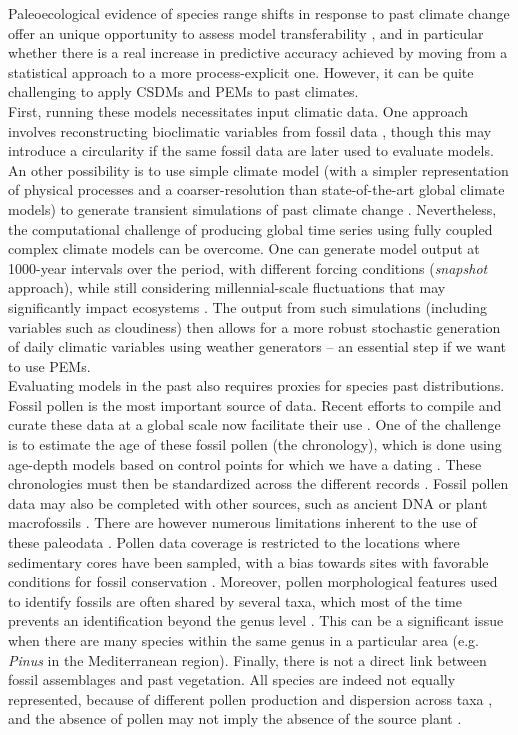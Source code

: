 Paleoecological evidence of species range shifts in response to past climate change offer an unique opportunity to assess model transferability \citep{Maguire2015}, and in particular whether there is a real increase in predictive accuracy achieved by moving from a statistical approach to a more process-explicit one. However, it can be quite challenging to apply CSDMs and PEMs to past climates. \\
First, running these models necessitates input climatic data. One approach involves reconstructing bioclimatic variables from fossil data \citep{CruzSilva2023}, though this may introduce a circularity if the same fossil data are later used to evaluate models. An other possibility is to use simple climate model (with a simpler representation of physical processes and a coarser-resolution than state-of-the-art global climate models) to generate transient simulations of past climate change \citep{Goosse2010}. Nevertheless, the computational challenge of producing global time series using fully coupled complex climate models can be overcome. One can generate model output at 1000-year intervals over the period, with different forcing conditions (\emph{snapshot} approach), while still considering millennial-scale fluctuations that may significantly impact ecosystems \citep{Armstrong2019}. The output from such simulations (including variables such as cloudiness) then allows for a more robust stochastic generation of daily climatic variables using weather generators \citep{Sommer2017} -- an essential step if we want to use PEMs. \\
Evaluating models in the past also requires proxies for species past distributions. 
Fossil pollen is the most important source of data. Recent efforts to compile and curate these data at a global scale now facilitate their use \citep{Fyfe2009, Williams2018}. One of the challenge is to estimate the age of these fossil pollen (the chronology), which is done using age-depth models based on control points for which we have a dating \citep{MorenoAmat2017}. These chronologies must then be standardized across the different records \citep{Herzschuh2022}. Fossil pollen data may also be completed with other sources, such as ancient DNA \citep{Dalen2007} or plant macrofossils \citep{Cordova2009}. There are however numerous limitations inherent to the use of these paleodata \citep{MorenoAmat2017}. Pollen data coverage is restricted to the locations where sedimentary cores have been sampled, with a bias towards sites with favorable conditions for fossil conservation \citep{Varela2011}. Moreover, pollen morphological features used to identify fossils are often shared by several taxa, which most of the time prevents an identification beyond the genus level \citep{MorenoAmat2017}. This can be a significant issue when there are many species within the same genus in a particular area (e.g. \emph{Pinus} in the Mediterranean region). Finally, there is not a direct link between fossil assemblages and past vegetation. All species are indeed not equally represented, because of different pollen production and  dispersion across taxa \citep{Goring2013}, and the absence of pollen may not imply the absence of the source plant \citep{Hicks2006}.\\
